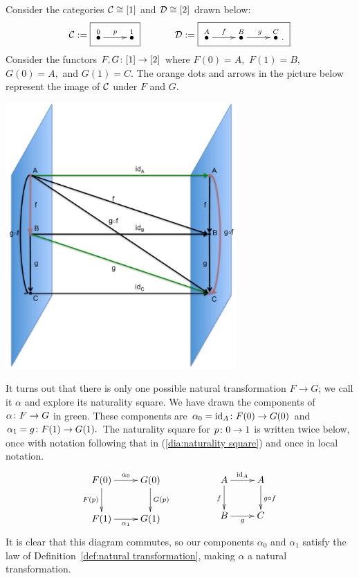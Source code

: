 \documentclass[../main/CT4S-EN-RU]{subfiles}
\begin{document}
\begin{exampleENG}
Consider the categories $\mathcal{C}\cong[1]$ and $\mathcal{D}\cong[2]$ drawn below:
$$\mcC:=\fbox{\xymatrix{\LMO{0}\ar[r]^p&\LMO{1}
}}
\hspace{.5in}
\mcD:=\fbox{\xymatrix{\LMO{A}\ar[r]^f&\LMO{B}\ar[r]^g&\LMO{C}.
}}
$$
Consider the functors $F,G\colon[1]\rightarrow[2]$ where $F(0)=A,$ $F(1)=B,$ $G(0)=A,$ and $G(1)=C.$ The orange dots and arrows in the picture below represent the image of $\mathcal{C}$ under $F$ and $G.$

\begin{center}
\includegraphics[height=4in]{natTrans}
\end{center}

It turns out that there is only one possible natural transformation $F\to G$; we call it $\alpha$ and explore its naturality square. We have drawn the components of $\alpha\colon F\rightarrow G$ in green. These components are $\alpha_0=\operatorname{id}_A\colon F(0)\rightarrow G(0)$ and $\alpha_1=g\colon F(1)\rightarrow G(1).$ The naturality square for $p\colon 0\rightarrow 1$ is written twice below, once with notation following that in (\ref{dia:naturality square}) and once in local notation.
$$
\xymatrix{
F(0)\ar[r]^{\alpha_0}\ar[d]_{F(p)}&G(0)\ar[d]^{G(p)}\\
F(1)\ar[r]_{\alpha_1}&G(1)}
\hspace{.6in}
\xymatrix{
A\ar[r]^{\id_A}\ar[d]_{f}&A\ar[d]^{g\circ f}\\
B\ar[r]_{g}&C
}
$$
It is clear that this diagram commutes, so our components $\alpha_0$ and $\alpha_1$ satisfy the law of Definition~\ref{def:natural transformation}, making $\alpha$ a natural transformation.
\end{exampleENG}
\end{document}
